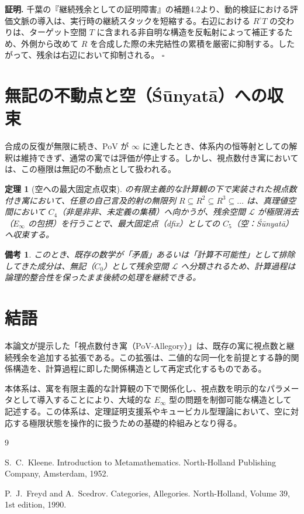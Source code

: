 \documentclass[11pt,a4paper]{article}
\newtheorem{theorem}[definition]{定理}
\newtheorem{remark}[definition]{備考}
\newenvironment{proof}{\par\noindent\textbf{証明. }}{\hfill$\square$\par}
\begin{document}
\begin{proof}
千葉の『継続残余としての証明障害』の補題4.2より、動的検証における評価文脈の導入は、実行時の継続スタックを短縮する。右辺における $R^\circ T$ の交わりは、ターゲット空間 $T$ に含まれる非自明な構造を反転射によって補正するため、外側から改めて $R$ を合成した際の未完結性の累積を厳密に抑制する。したがって、残余は右辺において抑制される。
\end{proof}

\section{無記の不動点と空（Śūnyatā）への収束}
合成の反復が無限に続き、PoV が $\infty$ に達したとき、体系内の恒等射としての解釈は維持できず、通常の寓では評価が停止する。しかし、視点数付き寓においては、この極限は無記の不動点として扱われる。

\begin{theorem}[空への最大固定点収束]
\citet{Kleene1952} の有限主義的な計算観の下で実装された視点数付き寓において、任意の自己言及的射の無限列 $R \subseteq R^2 \subseteq R^3 \subseteq \dots$ は、真理値空間において $C_4$（非是非非、未定義の集積）へ向かうが、残余空間 $\mathcal{L}$ が極限消去（$E_\infty$ の包摂）を行うことで、最大固定点（dfix）としての $C_5$（空：Śūnyatā）へ収束する。
\end{theorem}

\begin{remark}
このとき、既存の数学が「矛盾」あるいは「計算不可能性」として排除してきた成分は、無記（$C_0$）として残余空間 $\mathcal{L}$ へ分類されるため、計算過程は論理的整合性を保ったまま後続の処理を継続できる。
\end{remark}

\section{結語}
本論文が提示した「視点数付き寓（PoV-Allegory）」は、既存の寓に視点数と継続残余を追加する拡張である。この拡張は、二値的な同一化を前提とする静的関係構造を、計算過程に即した関係構造として再定式化するものである。

本体系は、寓を有限主義的な計算観の下で関係化し、視点数を明示的なパラメータとして導入することにより、大域的な $E_\infty$ 型の問題を制御可能な構造として記述する。この体系は、定理証明支援系やキュービカル型理論において、空に対応する極限状態を操作的に扱うための基礎的枠組みとなり得る。


\begin{thebibliography}{9}

S.~C.~Kleene.
\newblock Introduction to Metamathematics.
\newblock North-Holland Publishing Company, Amsterdam, 1952.

P.~J.~Freyd and A.~Scedrov.
\newblock Categories, Allegories.
\newblock North-Holland, Volume 39, 1st edition, 1990.

\end{thebibliography}
\end{document}
